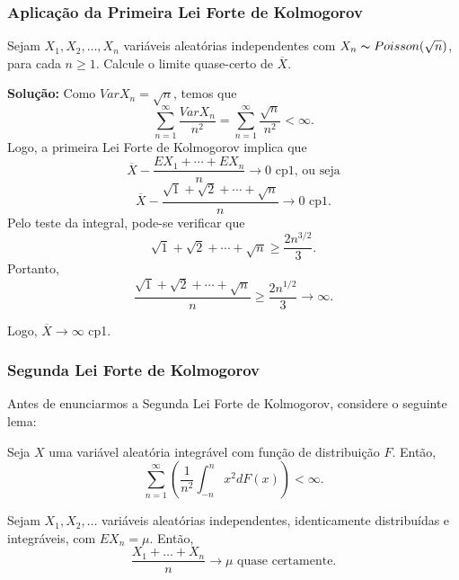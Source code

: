 \begin{frame}
\frametitle{\textbf{Aplicação da Primeira Lei Forte de
Kolmogorov}}
\baselineskip=13pt
\begin{block}{}



Sejam $X_1,X_2,\ldots,X_n$ variáveis aleatórias independentes com $X_n\thicksim Poisson(\sqrt{n})$, para cada $n\geq 1$. Calcule o limite quase-certo de $\overline{X}$.

{\bf Solução:} Como $Var X_n=\sqrt{n}$, temos que
$$\sum_{n=1}^{\infty}\frac{Var X_n}{n^2}=\sum_{n=1}^{\infty}\frac{\sqrt{n}}{n^2}<\infty.$$
Logo, a primeira Lei Forte de Kolmogorov implica que
$$\overline{X}-\frac{EX_1+\cdots+EX_n}{n}\rightarrow 0 \mbox{ cp1, ou seja}$$
$$\overline{X}-\frac{\sqrt{1}+\sqrt{2}+\cdots+\sqrt{n}}{n}\rightarrow 0 \mbox{ cp1.}$$
Pelo teste da integral, pode-se verificar que
$$\sqrt{1}+\sqrt{2}+\cdots+\sqrt{n}\geq \frac{2n^{3/2}}{3}.$$
Portanto,
$$\frac{\sqrt{1}+\sqrt{2}+\cdots+\sqrt{n}}{n}\geq \frac{2n^{1/2}}{3}\rightarrow\infty.$$

Logo, $\overline{X}\rightarrow\infty$ cp1.
\end{block}
\end{frame}


%
%
%
%
%


\begin{frame}
\frametitle{\textbf{Segunda Lei Forte de
Kolmogorov}}
Antes de enunciarmos a Segunda Lei Forte de Kolmogorov,
considere o seguinte lema:

\begin{lema}
	\label{lem:lem_segulei} Seja $X$ uma variável aleatória integrável
	com função de distribuição $F$. Então,
	$$\sum_{n=1}^{\infty}(\frac{1}{n^2}\int_{-n}^{n}x^2dF(x))<\infty.$$
\end{lema}


\begin{teo}
	Sejam $X_1,X_2,\ldots$ variáveis aleatórias independentes,
	identicamente distribuídas e integráveis, com $EX_n=\mu$. Então,
	$$\frac{X_1+\ldots+X_n}{n}\rightarrow \mu\mbox{ quase certamente.}$$
\end{teo}

\end{frame}

